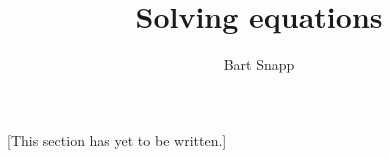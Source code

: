 \documentclass{article}
\author{Bart Snapp}
\title{Solving equations}
\begin{document}
\begin{abstract}
\end{abstract}
\maketitle

[This section has yet to be written.]
\end{document}
